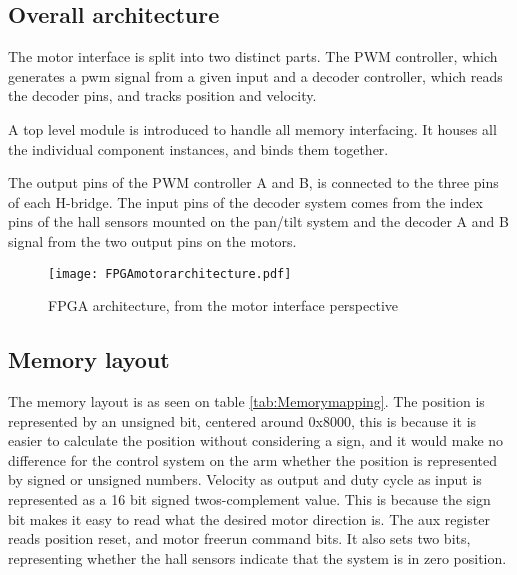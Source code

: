 \subsection{Overall architecture}
The motor interface is split into two distinct parts. The PWM controller, which generates a pwm signal from a given input and a decoder controller, which reads the decoder pins, and tracks position and velocity.

A top level module is introduced to handle all memory interfacing. It houses all the individual component instances, and binds them together.

The output pins of the PWM controller A and B, is connected to the three pins of each H-bridge.
The input pins of the decoder system comes from the index pins of the hall sensors mounted on the pan/tilt system and the decoder A and B signal from the two output pins on the motors.

\begin{figure}[htb]

\texttt{[image: FPGAmotorarchitecture.pdf]}

\caption{FPGA architecture, from the motor interface perspective}
\label{fig:FPGAMotorArchitecture}
\end{figure}

\subsection{Memory layout}
The memory layout is as seen on table \ref{tab:Memorymapping}. The position is represented by an unsigned bit, centered around 0x8000, this is because it is easier to calculate the position without considering a sign, and it would make no difference for the control system on the arm whether the position is represented by signed or unsigned numbers.
Velocity as output and duty cycle as input is represented as a 16 bit signed twos-complement value.
This is because the sign bit makes it easy to read what the desired motor direction is.
The aux register reads position reset, and motor freerun command bits. It also sets two bits, representing whether the hall sensors indicate that the system is in zero position.



